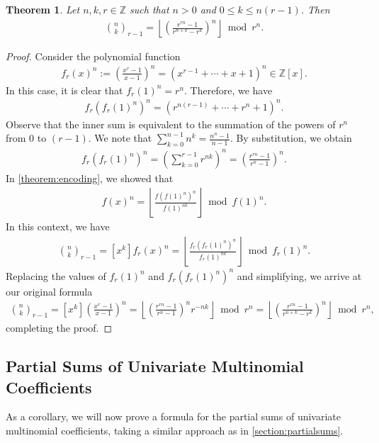 \documentclass[10pt,a4paper]{article}
\theoremstyle{plain}
\newtheorem{theorem}{Theorem}[section]
\newcommand{\floor}[1]{\left\lfloor #1 \right\rfloor}
\newcommand{\Z}{\mathbb{Z}}
\begin{document}
\begin{theorem}
\label{proof:multinomialformula}
Let $n,k,r \in \mathbb{Z}$ such that $n > 0$ and $0 \leq k \leq n (r-1)$. Then
\begin{align*}
    \binom{n}{k}_{r-1} = \floor{\left(\frac{r^{rn} - 1}{r^{n+k} - r^k}\right)^n} \bmod r^n .
\end{align*}
\end{theorem}
\begin{proof}
Consider the polynomial function
\begin{align*}
    f_r(x)^n := \left(\frac{x^{r}-1}{x-1}\right)^n = (x^{r-1} + \cdots + x + 1)^n \in \Z[x].
\end{align*}
In this case, it is clear that $f_r(1)^n = r^n$. Therefore, we have
\begin{align*}
    f_r(f_r(1)^n)^n = (r^{n(r-1)} + \cdots + r^n + 1)^n .
\end{align*}
Observe that the inner sum is equivalent to the summation of the powers of $r^n$ from $0$ to $(r-1)$. We note that $\sum_{k=0}^{n-1} n^k = \frac{n^n-1}{n-1}$. By substitution, we obtain
\begin{align*}
    f_r(f_r(1)^n)^n = \left(\sum_{k=0}^{r-1} r^{nk}\right)^n = \left(\frac{r^{rn} - 1}{r^{n} - 1}\right)^n .
\end{align*}
In \cref{theorem:encoding}, we showed that
\begin{align*}
    [x^k] f(x)^{n} = \left\lfloor\frac{f(f(1)^n)^{n}}{f(1)^{n k}}\right\rfloor \bmod{f(1)^{n}} .
\end{align*}
In this context, we have
\begin{align*}
    \binom{n}{k}_{r-1} = [x^k] f_r(x)^{n} = \left\lfloor\frac{f_r(f_r(1)^n)^{n}}{f_r(1)^{n k}}\right\rfloor \bmod{f_r(1)^{n}} .
\end{align*}
Replacing the values of $f_r(1)^n$ and $f_r(f_r(1)^n)^n$ and simplifying, we arrive at our original formula
\begin{align*}
    \binom{n}{k}_{r-1} = [x^k] \left(\frac{x^{r}-1}{x-1}\right)^n
    = \left\lfloor \left(\frac{r^{rn} - 1}{r^{n} - 1}\right)^n r^{-n k}\right\rfloor \bmod r^n
    = \left\lfloor \left(\frac{r^{rn} - 1}{r^{n+k} - r^k}\right)^n\right\rfloor \bmod r^n ,
\end{align*}
completing the proof.
\end{proof}

\subsection{Partial Sums of Univariate Multinomial Coefficients}
As a corollary, we will now prove a formula for the partial sums of univariate multinomial coefficients, taking a similar approach as in \cref{section:partialsums}.
\end{document}
